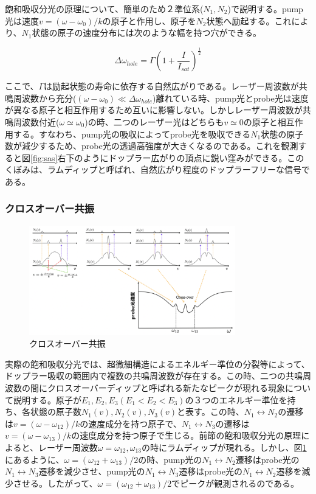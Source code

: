 \documentclass[dvipdfmx]{jsarticle}
\begin{document}
飽和吸収分光の原理について、簡単のため２準位系($N_1, N_2$)で説明する。pump光は速度$v = (\omega - \omega_0)/k$の原子と作用し、原子を$N_2$状態へ励起する。これにより、$N_1$状態の原子の速度分布には次のような幅を持つ穴ができる。\cite{foot}

\begin{equation}
\Delta\omega_{hole} = \Gamma \left( 1 + \frac{I}{I_{sat}} \right) ^ \frac{1}{2}
\end{equation}

ここで、$\Gamma$は励起状態の寿命に依存する自然広がりである。レーザー周波数が共鳴周波数から充分($(\omega - \omega_0) \ll \Delta\omega_{hole}$)離れている時、pump光とprobe光は速度が異なる原子と相互作用するため互いに影響しない。しかしレーザー周波数が共鳴周波数付近($\omega \simeq \omega_0$)の時、二つのレーザー光はどちらも$v \simeq 0$の原子と相互作用する。すなわち、pump光の吸収によってprobe光を吸収できる$N_1$状態の原子数が減少するため、probe光の透過高強度が大きくなるのである。これを観測すると図\ref{fig:sas}右下のようにドップラー広がりの頂点に鋭い窪みができる。このくぼみは、ラムディップと呼ばれ、自然広がり程度のドップラーフリーな信号である。

\subsubsection{クロスオーバー共振}
\begin{figure}
\centering
\includegraphics[width=0.8\textwidth]{images/cross-over_graph.png}
\caption{\label{fig:cross-over}クロスオーバー共振}
\end{figure}
実際の飽和吸収分光では、超微細構造によるエネルギー準位の分裂等によって、ドップラー吸収の範囲内で複数の共鳴周波数が存在する。この時、二つの共鳴周波数の間にクロスオーバーディップと呼ばれる新たなピークが現れる現象について説明する。原子が$E_1, E_2, E_3(E_1 < E_2 < E_3)$の３つのエネルギー準位を持ち、各状態の原子数$N_1(v), N_2(v), N_3(v)$と表す。この時、$N_1\leftrightarrow N_2$の遷移は$v = (\omega - \omega_{12})/k$の速度成分を持つ原子で、$N_1\leftrightarrow N_3$の遷移は$v = (\omega - \omega_{13})/k$の速度成分を持つ原子で生じる。前節の飽和吸収分光の原理によると、レーザー周波数$\omega = \omega_{12}, \omega_{13}$の時にラムディップが現れる。しかし、図\ref{fig:cross-over}にあるように、$\omega = \left(\omega_{12} + \omega_{13} \right) / 2$の時、pump光の$N_1\leftrightarrow N_2$遷移はprobe光の$N_1\leftrightarrow N_3$遷移を減少させ、pump光の$N_1\leftrightarrow N_3$遷移はprobe光の$N_1\leftrightarrow N_2$遷移を減少させる。したがって、$\omega = \left(\omega_{12} + \omega_{13} \right) / 2$でピークが観測されるのである。
\end{document}
